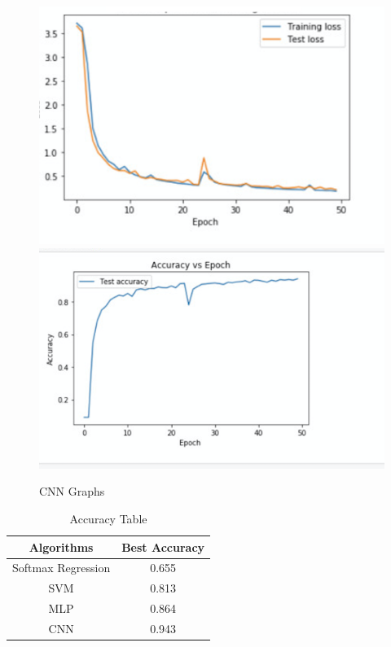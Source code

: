 \documentclass[10pt]{article}
\begin{document}
\begin{figure}[h]
\centering
\includegraphics[scale=0.4]{CNN LOSS}
\includegraphics[scale=0.4]{CNN ACC}
\caption{CNN Graphs}
\end{figure}

\begin{table}
\centering
\begin{tabular}{|c|c|}
\hline
Algorithms&Best Accuracy\\
\hline
Softmax Regression&0.655\\
\hline
SVM&0.813\\
\hline
MLP&0.864\\
\hline
CNN&0.943\\
\hline
\end{tabular}
\caption{Accuracy Table}
\end{table}
\end{document}
